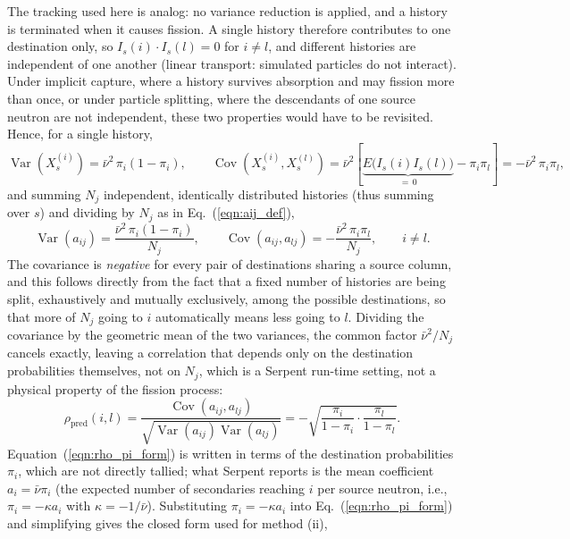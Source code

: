 \documentclass{style/nseJournal}
\begin{document}
The tracking used here is analog: no variance reduction is applied, and a history is terminated when it causes fission. A single history therefore contributes to one destination only, so $I_s(i)\cdot I_s(l)=0$ for $i\neq l$, and different histories are independent of one another (linear transport: simulated particles do not interact). Under implicit capture, where a history survives absorption and may fission more than once, or under particle splitting, where the descendants of one source neutron are not independent, these two properties would have to be revisited. Hence, for a single history,
\begin{equation}
  \operatorname{Var}\left(X_s^{(i)}\right) = \bar\nu^2\,\pi_i(1-\pi_i), \qquad
  \operatorname{Cov}\left(X_s^{(i)},X_s^{(l)}\right) = \bar\nu^2\left[\underbrace{E\big(I_s(i)I_s(l)\big)}_{=\,0} - \pi_i\pi_l\right] = -\bar\nu^2\,\pi_i\pi_l ,
  \label{eqn:single_history}
\end{equation}
and summing $N_j$ independent, identically distributed histories (thus summing over $s$) and dividing by $N_j$ as in Eq.~(\ref{eqn:aij_def}),
\begin{equation}
  \operatorname{Var}(a_{ij}) = \frac{\bar\nu^2\,\pi_i(1-\pi_i)}{N_j}, \qquad
  \operatorname{Cov}(a_{ij},a_{lj}) = -\frac{\bar\nu^2\,\pi_i\pi_l}{N_j}, \qquad i\neq l .
  \label{eqn:multinomial_cov}
\end{equation}
The covariance is \emph{negative} for every pair of destinations sharing a source column, and this  follows directly from the fact that a fixed number of histories are being split, exhaustively and mutually exclusively, among the possible destinations, so that more of $N_j$ going to $i$ automatically means less going to $l$. Dividing the covariance by the geometric mean of the two variances, the common factor $\bar\nu^2/N_j$ cancels exactly, leaving a correlation that depends only on the destination probabilities themselves, not on $N_j$, which is a Serpent run-time setting, not a physical property of the fission process:
\begin{equation}
  \rho_{\text{pred}}(i,l) = \frac{\operatorname{Cov}(a_{ij},a_{lj})}{\sqrt{\operatorname{Var}(a_{ij})\operatorname{Var}(a_{lj})}}
  = -\sqrt{\frac{\pi_i}{1-\pi_i}\cdot\frac{\pi_l}{1-\pi_l}} .
  \label{eqn:rho_pi_form}
\end{equation}
Equation~(\ref{eqn:rho_pi_form}) is written in terms of the destination probabilities $\pi_i$, which are not directly tallied; what Serpent reports is the mean coefficient $a_i = \bar\nu\pi_i$ (the expected number of secondaries reaching $i$ per source neutron, i.e., $\pi_i = -\kappa a_i$ with $\kappa=-1/\bar\nu$). Substituting $\pi_i=-\kappa a_i$ into Eq.~(\ref{eqn:rho_pi_form}) and simplifying gives the closed form used for method (ii),
\end{document}
